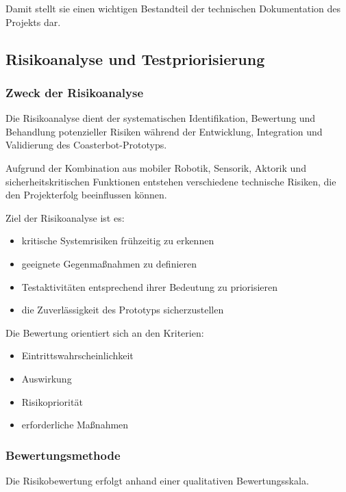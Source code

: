 \documentclass[
  a4paper,
  12pt,
  DIV=12,        %
  parskip=half,  %
  headings=small %
]{scrartcl}
\theoremstyle{definition}
\providecommand{\tightlist}{%
  \setlength{\itemsep}{0pt}\setlength{\parskip}{0pt}}
\theoremstyle{definition}
\begin{document}
Damit stellt sie einen wichtigen Bestandteil der technischen
Dokumentation des Projekts dar.

\subsection{Risikoanalyse und
Testpriorisierung}\label{risikoanalyse-und-testpriorisierung}

\subsubsection{Zweck der Risikoanalyse}\label{zweck-der-risikoanalyse}

Die Risikoanalyse dient der systematischen Identifikation, Bewertung und
Behandlung potenzieller Risiken während der Entwicklung, Integration und
Validierung des Coasterbot-Prototyps.

Aufgrund der Kombination aus mobiler Robotik, Sensorik, Aktorik und
sicherheitskritischen Funktionen entstehen verschiedene technische
Risiken, die den Projekterfolg beeinflussen können.

Ziel der Risikoanalyse ist es:

\begin{itemize}
\tightlist
\item
  kritische Systemrisiken frühzeitig zu erkennen
\item
  geeignete Gegenmaßnahmen zu definieren
\item
  Testaktivitäten entsprechend ihrer Bedeutung zu priorisieren
\item
  die Zuverlässigkeit des Prototyps sicherzustellen
\end{itemize}

Die Bewertung orientiert sich an den Kriterien:

\begin{itemize}
\tightlist
\item
  Eintrittswahrscheinlichkeit
\item
  Auswirkung
\item
  Risikopriorität
\item
  erforderliche Maßnahmen
\end{itemize}

\subsubsection{Bewertungsmethode}\label{bewertungsmethode}

Die Risikobewertung erfolgt anhand einer qualitativen Bewertungsskala.
\end{document}
